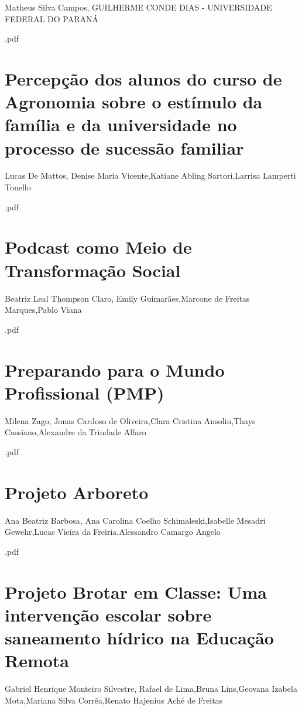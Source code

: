 Matheus Silva Campos, GUILHERME CONDE DIAS - UNIVERSIDADE FEDERAL DO PARANÁ



.pdf\section{Percepção dos alunos do curso de Agronomia sobre o estímulo da família e da universidade no processo de sucessão familiar}

Lucas De Mattos, Denise Maria Vicente,Katiane Abling Sartori,Larrisa Lamperti Tonello



.pdf\section{Podcast como Meio de Transformação Social}

Beatriz Leal Thompson Claro, Emily Guimarães,Marcone de Freitas Marques,Pablo Viana



.pdf\section{Preparando para o Mundo Profissional (PMP)}

Milena Zago, Jonas Cardoso de Oliveira,Clara Cristina Ansolin,Thays Cassiano,Alexandre da Trindade Alfaro



.pdf\section{Projeto Arboreto}

Ana Beatriz Barbosa, Ana Carolina Coelho Schimaleski,Isabelle Mesadri Gewehr,Lucas Vieira da Freiria,Alessandro Camargo Angelo



.pdf\section{Projeto Brotar em Classe: Uma intervenção escolar sobre saneamento hídrico na Educação Remota   }

Gabriel Henrique Monteiro Silvestre, Rafael de Lima,Bruna Lins,Geovana Izabela Mota,Mariana Silva Corrêa,Renato  Hajenius Aché de Freitas

